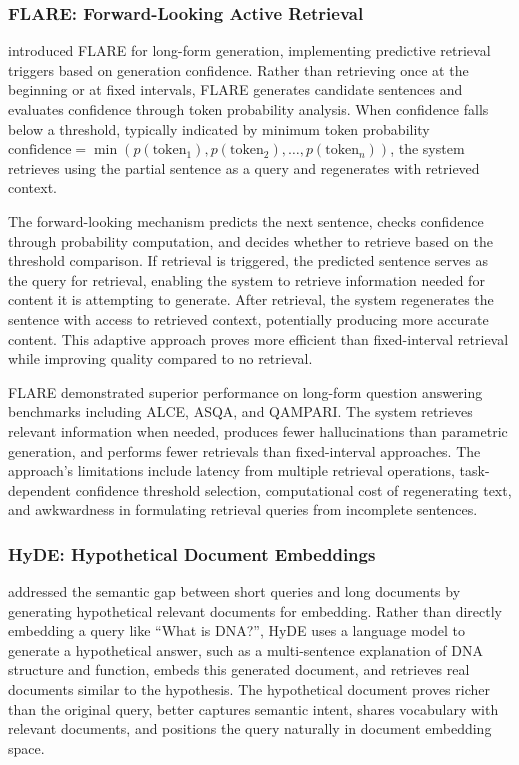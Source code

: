 \subsubsection{FLARE: Forward-Looking Active Retrieval}

\citet{jiang2023active} introduced FLARE for long-form generation, implementing predictive retrieval triggers based on generation confidence. Rather than retrieving once at the beginning or at fixed intervals, FLARE generates candidate sentences and evaluates confidence through token probability analysis. When confidence falls below a threshold, typically indicated by minimum token probability $\text{confidence} = \min(p(\text{token}_1), p(\text{token}_2), \ldots, p(\text{token}_n))$, the system retrieves using the partial sentence as a query and regenerates with retrieved context.

The forward-looking mechanism predicts the next sentence, checks confidence through probability computation, and decides whether to retrieve based on the threshold comparison. If retrieval is triggered, the predicted sentence serves as the query for retrieval, enabling the system to retrieve information needed for content it is attempting to generate. After retrieval, the system regenerates the sentence with access to retrieved context, potentially producing more accurate content. This adaptive approach proves more efficient than fixed-interval retrieval while improving quality compared to no retrieval.

FLARE demonstrated superior performance on long-form question answering benchmarks including ALCE, ASQA, and QAMPARI. The system retrieves relevant information when needed, produces fewer hallucinations than parametric generation, and performs fewer retrievals than fixed-interval approaches. The approach's limitations include latency from multiple retrieval operations, task-dependent confidence threshold selection, computational cost of regenerating text, and awkwardness in formulating retrieval queries from incomplete sentences.

\subsubsection{HyDE: Hypothetical Document Embeddings}

\citet{gao2022precise} addressed the semantic gap between short queries and long documents by generating hypothetical relevant documents for embedding. Rather than directly embedding a query like ``What is DNA?'', HyDE uses a language model to generate a hypothetical answer, such as a multi-sentence explanation of DNA structure and function, embeds this generated document, and retrieves real documents similar to the hypothesis. The hypothetical document proves richer than the original query, better captures semantic intent, shares vocabulary with relevant documents, and positions the query naturally in document embedding space.

